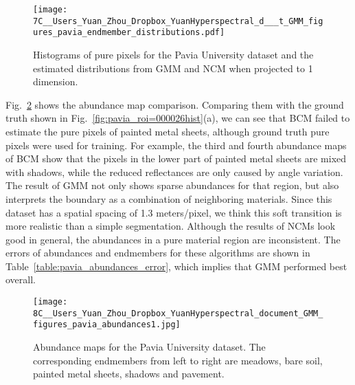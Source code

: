 \documentclass[twocolumn,english]{IEEEtran}
\theoremstyle{plain}
\begin{document}
\begin{figure}
\begin{centering}
\texttt{[image: 7C\_\_Users\_Yuan\_Zhou\_Dropbox\_YuanHyperspectral\_d\_\_\_t\_GMM\_figures\_pavia\_endmember\_distributions.pdf]}
\par\end{centering}
\caption{Histograms of pure pixels for the Pavia University dataset and the
estimated distributions from GMM and NCM when projected to 1 dimension.}

\label{fig:pavia_histogram}
\end{figure}

Fig.~\ref{fig:pavia_abundances} shows the abundance map comparison.
Comparing them with the ground truth shown in Fig.~\ref{fig:pavia_roi=000026hist}(a),
we can see that BCM failed to estimate the pure pixels of painted
metal sheets, although ground truth pure pixels were used for training.
For example, the third and fourth abundance maps of BCM show that
the pixels in the lower part of painted metal sheets are mixed with
shadows, while the reduced reflectances are only caused by angle variation.
The result of GMM not only shows sparse abundances for that region,
but also interprets the boundary as a combination of neighboring materials.
Since this dataset has a spatial spacing of 1.3 meters/pixel, we think
this soft transition is more realistic than a simple segmentation.
Although the results of NCMs look good in general, the abundances
in a pure material region are inconsistent. The errors of abundances
and endmembers for these algorithms are shown in Table~\ref{table:pavia_abundances_error},
which implies that GMM performed best overall.

\begin{figure}
\begin{centering}
\texttt{[image: 8C\_\_Users\_Yuan\_Zhou\_Dropbox\_YuanHyperspectral\_document\_GMM\_figures\_pavia\_abundances1.jpg]}
\par\end{centering}
\caption{Abundance maps for the Pavia University dataset. The corresponding
endmembers from left to right are meadows, bare soil, painted metal
sheets, shadows and pavement.}

\label{fig:pavia_abundances}
\end{figure}
\end{document}
